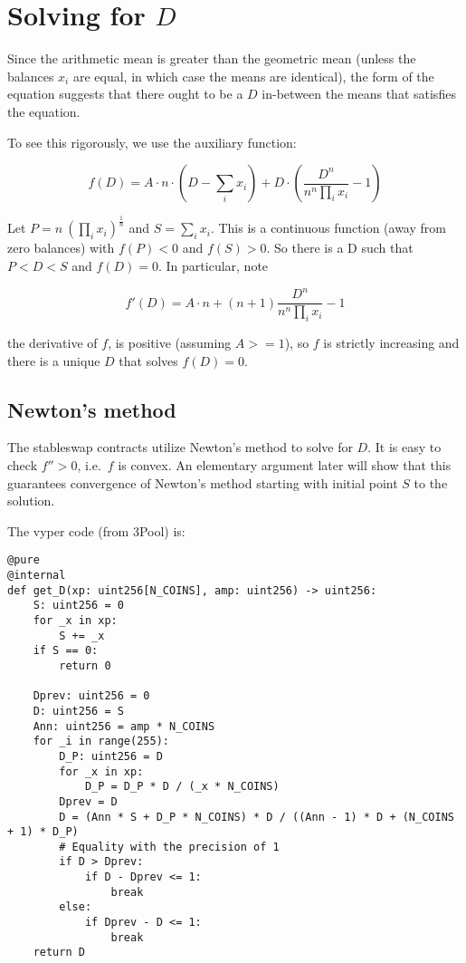 \documentclass[
]{article}
\begin{document}
\hypertarget{solving-for-d}{%
\section{\texorpdfstring{Solving for
\(D\)}{Solving for D}}\label{solving-for-d}}

Since the arithmetic mean is greater than the geometric mean (unless the
balances \(x_i\) are equal, in which case the means are identical), the
form of the equation suggests that there ought to be a \(D\) in-between
the means that satisfies the equation.

To see this rigorously, we use the auxiliary function:

\[ f(D) = A \cdot n \cdot (D - \sum_i x_i)  + D \cdot (\frac{D^{n}}{n^n \prod_i x_i} - 1) \]

Let \(P = n\ (\prod_i x_i)^{\frac{1}{n}}\) and \(S = \sum_i x_i\). This
is a continuous function (away from zero balances) with \(f(P) < 0\) and
\(f(S) > 0\). So there is a D such that \(P < D < S\) and \(f(D) = 0\).
In particular, note

\[ f'(D) = A\cdot n + (n+1) \frac{D^n}{n^n \prod_i x_i} - 1 \]

the derivative of \(f\), is positive (assuming \(A >= 1\)), so \(f\) is
strictly increasing and there is a unique \(D\) that solves
\(f(D) = 0\).

\hypertarget{newtons-method}{%
\subsection{Newton's method}\label{newtons-method}}

The stableswap contracts utilize Newton's method to solve for \(D\). It
is easy to check \(f'' > 0\), i.e.~\(f\) is convex. An elementary
argument later will show that this guarantees convergence of Newton's
method starting with initial point \(S\) to the solution.

The vyper code (from 3Pool) is:

\begin{verbatim}
@pure
@internal
def get_D(xp: uint256[N_COINS], amp: uint256) -> uint256:
    S: uint256 = 0
    for _x in xp:
        S += _x
    if S == 0:
        return 0

    Dprev: uint256 = 0
    D: uint256 = S
    Ann: uint256 = amp * N_COINS
    for _i in range(255):
        D_P: uint256 = D
        for _x in xp:
            D_P = D_P * D / (_x * N_COINS)
        Dprev = D
        D = (Ann * S + D_P * N_COINS) * D / ((Ann - 1) * D + (N_COINS + 1) * D_P)
        # Equality with the precision of 1
        if D > Dprev:
            if D - Dprev <= 1:
                break
        else:
            if Dprev - D <= 1:
                break
    return D
\end{verbatim}
\end{document}

